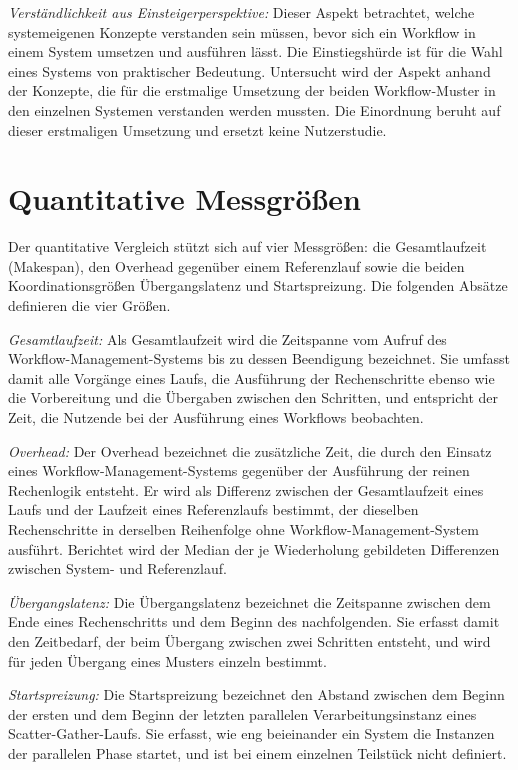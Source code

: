 \emph{Verständlichkeit aus Einsteigerperspektive:} Dieser Aspekt
betrachtet, welche systemeigenen Konzepte verstanden sein müssen,
bevor sich ein Workflow in einem System umsetzen und ausführen
lässt. Die Einstiegshürde ist für die Wahl eines Systems von
praktischer Bedeutung.  Untersucht wird der Aspekt anhand der Konzepte, die für die erstmalige Umsetzung der beiden Workflow-Muster in den einzelnen Systemen verstanden werden mussten. Die Einordnung beruht auf dieser erstmaligen Umsetzung und ersetzt keine Nutzerstudie.


\section{Quantitative Messgrößen}
\label{sec:methodik:messgroessen}
Der quantitative Vergleich stützt sich auf vier Messgrößen: die Gesamtlaufzeit (Makespan), den Overhead gegenüber einem Referenzlauf sowie die beiden Koordinationsgrößen Übergangslatenz und Startspreizung. Die folgenden Absätze definieren die vier
Größen.

\begin{sloppypar}
\emph{Gesamtlaufzeit:} Als Gesamtlaufzeit wird die Zeitspanne vom
Aufruf des Workflow-Management-Systems bis zu dessen Beendigung
bezeichnet. Sie umfasst damit alle Vorgänge eines Laufs, die
Ausführung der Rechenschritte ebenso wie die Vorbereitung und die
Übergaben zwischen den Schritten, und entspricht der Zeit, die
Nutzende bei der Ausführung eines Workflows beobachten.
\end{sloppypar}

\emph{Overhead:} Der Overhead bezeichnet die zusätzliche Zeit, die durch den Einsatz eines Workflow-Management-Systems gegenüber der Ausführung der reinen Rechenlogik entsteht. Er wird als Differenz zwischen der Gesamtlaufzeit eines Laufs und der Laufzeit eines Referenzlaufs bestimmt, der dieselben Rechenschritte in derselben Reihenfolge ohne Workflow-Management-System ausführt. Berichtet wird der Median der je Wiederholung gebildeten
Differenzen zwischen System- und Referenzlauf.

\emph{Übergangslatenz:} Die Übergangslatenz bezeichnet die
Zeitspanne zwischen dem Ende eines Rechenschritts und dem Beginn des
nachfolgenden. Sie erfasst damit den Zeitbedarf, der beim Übergang
zwischen zwei Schritten entsteht, und wird für jeden Übergang eines
Musters einzeln bestimmt.

\emph{Startspreizung:} Die Startspreizung bezeichnet den Abstand
zwischen dem Beginn der ersten und dem Beginn der letzten parallelen
Verarbeitungsinstanz eines Scatter-Gather-Laufs. Sie erfasst, wie
eng beieinander ein System die Instanzen der parallelen Phase startet,
und ist bei einem einzelnen Teilstück nicht definiert.

